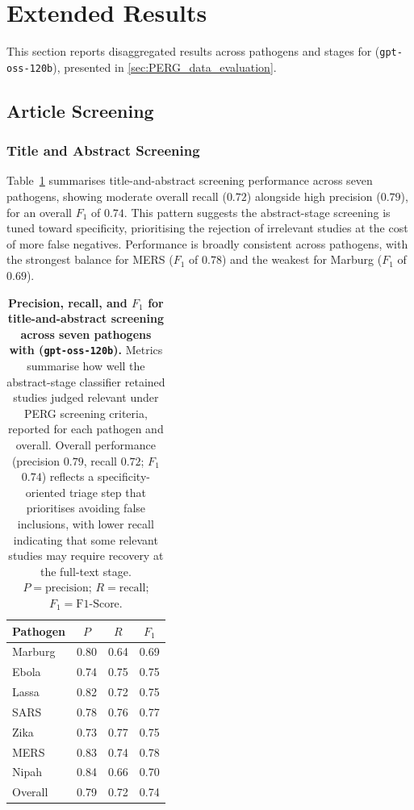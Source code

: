 \clearpage
\section{Extended  Results}\label{app:pipeline_stage_eval}
This section reports disaggregated results across pathogens and stages for \name{} (\texttt{gpt-oss-120b}), presented in \cref{sec:PERG_data_evaluation}.

\subsection{Article Screening}
\label{app:extended_results_article_screening}

\subsubsection*{Title and Abstract Screening}
Table~\ref{tab:abstract_screening_metrics} summarises title-and-abstract screening performance across seven pathogens, showing moderate overall recall ($0.72$) alongside high precision ($0.79$), for an overall $F_1$ of $0.74$. This pattern suggests the abstract-stage screening is tuned toward specificity, prioritising the rejection of irrelevant studies at the cost of more false negatives. Performance is broadly consistent across pathogens, with the strongest balance for MERS ($F_1$ of $0.78$) and the weakest for Marburg ($F_1$ of $0.69$).


\begin{table}[h]
\centering
\caption{\textbf{Precision, recall, and $F_1$ for title-and-abstract screening across seven pathogens with \name{} (\texttt{gpt-oss-120b}).} Metrics summarise how well the abstract-stage classifier retained studies judged relevant under PERG screening criteria, reported for each pathogen and overall. Overall performance (precision $0.79$, recall $0.72$; $F_1$ $0.74$) reflects a specificity-oriented triage step that prioritises avoiding false inclusions, with lower recall indicating that some relevant studies may require recovery at the full-text stage. $P=\text{precision}$; $R=\text{recall}$; $F_1=\text{F1-Score}$.}
\label{tab:abstract_screening_metrics}
\renewcommand{\arraystretch}{1}
\setlength{\tabcolsep}{8pt}
{\footnotesize
\begin{tabular}{l|ccc}
\toprule
\textbf{Pathogen} & $P$ & $R$ & $F_1$ \\
\midrule
Marburg & 0.80 & 0.64 & 0.69 \\
Ebola & 0.74 & 0.75 & 0.75 \\
Lassa & 0.82 & 0.72 & 0.75 \\
SARS & 0.78 & 0.76 & 0.77 \\
Zika & 0.73 & 0.77 & 0.75 \\
MERS & 0.83 & 0.74 & 0.78 \\
Nipah & 0.84 & 0.66 & 0.70 \\
\midrule
Overall & 0.79 & 0.72 & 0.74 \\
\bottomrule
\end{tabular}
}
\end{table}



